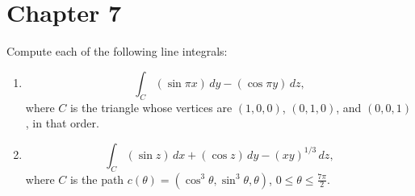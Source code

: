 \documentclass[openany]{book}
\begin{document}
\section{Chapter 7}

\begin{prob}[3]
    Compute each of the following line integrals:
    \begin{enumerate}
        \item[(a)] 
        \[
        \int_C (\sin \pi x) \, dy - (\cos \pi y) \, dz,
        \]
        where \( C \) is the triangle whose vertices are \((1, 0, 0)\), \((0, 1, 0)\), and \((0, 0, 1)\), in that order.
    
        \item[(b)]
        \[
        \int_C (\sin z) \, dx + (\cos z) \, dy - (xy)^{1/3} \, dz,
        \]
        where \( C \) is the path \( c(\theta) = (\cos^3 \theta, \sin^3 \theta, \theta) \), \( 0 \leq \theta \leq \frac{7\pi}{2} \).
    \end{enumerate}
\end{prob}
\end{document}
